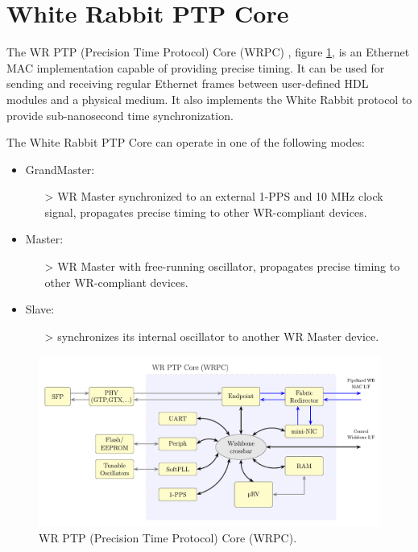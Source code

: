 \newpage

\section{White Rabbit PTP Core}

The WR PTP (Precision Time Protocol) Core (WRPC) \cite{WR-core:wiki} \cite{WR-core:manual} \cite{WRPC:ohwr}, figure \ref{fig:WRPC}, is an Ethernet MAC implementation capable of providing precise timing. 
It can be used for sending and receiving regular Ethernet frames between user-defined HDL modules and a physical medium. 
It also implements the White Rabbit protocol to provide sub-nanosecond time synchronization.

\vspace{5 mm}

\noindent The White Rabbit PTP Core can operate in one of the following modes:
 
\begin{itemize}
\item GrandMaster:
    \begin{itemize}
    \item[>] WR Master synchronized to an external 1-PPS and 10 MHz clock signal, propagates precise timing to other WR-compliant devices.
    \end{itemize}
\item Master:
    \begin{itemize}
    \item[>] WR Master with free-running oscillator, propagates precise timing to other WR-compliant devices.
    \end{itemize}
\item Slave:
    \begin{itemize}
    \item[>] synchronizes its internal oscillator to another WR Master device.
    \end{itemize}
\end{itemize}

\begin{figure}[H]
    \centering
    \includegraphics[width=15cm]{figures/WRPC.pdf}
    \caption{WR PTP (Precision Time Protocol) Core (WRPC).}
    \label{fig:WRPC}
\end{figure}

